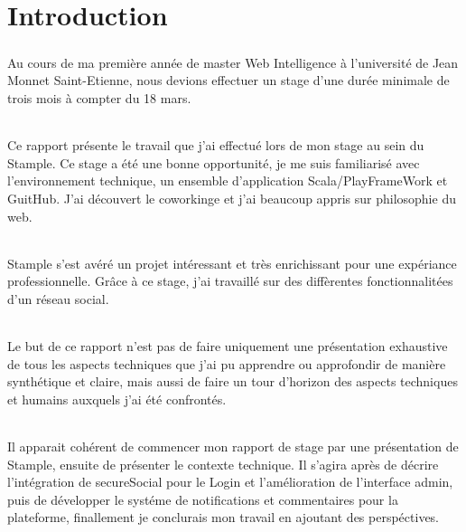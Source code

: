 \chapter{Introduction}
\paragraph{}
Au cours de ma première année de master Web Intelligence à l'université de Jean Monnet Saint-Etienne, nous devions effectuer un stage d'une durée minimale de trois mois à compter du 18 mars.
\subparagraph{}
Ce rapport présente le travail que j'ai effectué lors de mon stage au sein du Stample.
\newline
Ce stage a été une bonne opportunité, je me suis familiarisé avec l'environnement technique, un ensemble d'application Scala/PlayFrameWork et GuitHub.
J'ai découvert le coworkinge et j'ai beaucoup appris sur philosophie du web.
\subparagraph{}
Stample s'est avéré un projet intéressant et très enrichissant pour une expériance professionnelle. Gr\^ace à ce stage, j'ai travaillé sur des diffèrentes fonctionnalitées d'un réseau social.
\subparagraph{}
Le but de ce rapport n’est pas de faire uniquement une présentation exhaustive de tous les aspects techniques que j’ai pu apprendre ou approfondir de manière synthétique et claire, mais aussi de faire un tour d’horizon des aspects techniques et humains auxquels j’ai été confrontés.
\subparagraph{}
Il apparait cohérent de commencer mon rapport de stage par une présentation de Stample, ensuite de présenter le contexte technique. Il s’agira après de décrire l'intégration de secureSocial pour le Login et l'amélioration de l'interface admin, puis de développer le systéme de notifications et commentaires pour la plateforme, finallement je conclurais mon travail en ajoutant des perspéctives.
\newpage